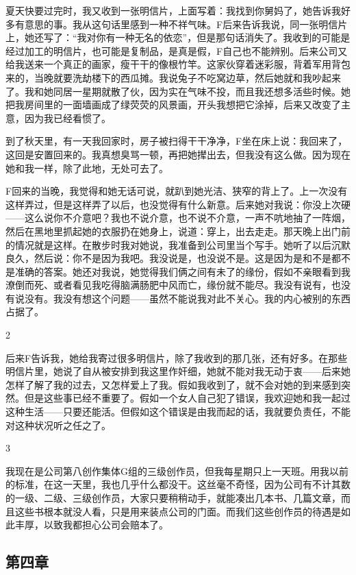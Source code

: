 夏天快要过完时，我又收到一张明信片，上面写着：我找到你舅妈了，她告诉我好多有意思的事。我从这句话里感到一种不祥气味。F后来告诉我说，同一张明信片上，她还写了：“我对你有一种无名的依恋”，但是那句话消失了。我收到的可能是经过加工的明信片，也可能是复制品，是真是假，F自己也不能辨别。后来公司又给我送来一个真正的画家，瘦干干的像根竹竿。这家伙穿着迷彩服，背着军用背包来的，当晚就要洗劫楼下的西瓜摊。我说兔子不吃窝边草，然后她就和我吵起来了。我和她同居一星期就散了伙，因为实在气味不投，而且我还想多活些时候。她把我房间里的一面墙画成了绿荧荧的风景画，开头我想把它涂掉，后来又改变了主意，因为我已经看惯了。 

到了秋天里，有一天我回家时，房子被扫得干干净净，F坐在床上说：我回来了，这回是安置回来的。我真想臭骂一顿，再把她撵出去，但我没有这么做。因为现在她和我一样，除了此地，无处可去了。 

F回来的当晚，我觉得和她无话可说，就趴到她光洁、狭窄的背上了。上一次没有这样弄过，但是这样弄了以后，也没觉得有什么新意。后来她对我说：你没上次硬——这么说你不介意吧？我也不说介意，也不说不介意，一声不吭地抽了一阵烟，然后在黑地里抓起她的衣服扔在她身上，说道：穿上，出去走走。那天晚上出门前的情况就是这样。在散步时我对她说，我准备到公司里当个写手。她听了以后沉默良久，然后说：你不是因为我吧。我没说是，也没说不是。这是因为是和不是都不是准确的答案。她还对我说，她觉得我们俩之间有未了的缘份，假如不亲眼看到我潦倒而死、或者看见我吃得脑满肠肥中风而亡，缘份就不能尽。我没有说有，也没有说没有。我没有想这个问题——虽然不能说我对此不关心。我的内心被别的东西占据了。 

2 

后来F告诉我，她给我寄过很多明信片，除了我收到的那几张，还有好多。在那些明信片里，她说了自从被安排到我这里作奸细，她就不能对我无动于衷——后来她怎样了解了我的过去，又怎样爱上了我。假如我收到了，就不会对她的到来感到突然。但是这些事已经不重要了。假如一个女人自己犯了错误，我欢迎她和我一起过这种生活——只要还能活。但假如这个错误是由我而起的话，我就要负责任，不能对这种状况听之任之了。 

3 

我现在是公司第八创作集体G组的三级创作员，但我每星期只上一天班。用我以前的标准，在这一天里，我也几乎什么都没干。这丝毫不奇怪，因为公司有不计其数的一级、二级、三级创作员，大家只要稍稍动手，就能凑出几本书、几篇文章，而且这些书根本就没人看，只是用来装点公司的门面。而我们这些创作员的待遇是如此丰厚，以致我都担心公司会赔本了。

\subsection{第四章}

